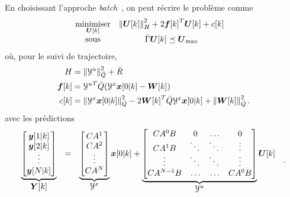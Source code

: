 \documentclass[../main.tex]{subfiles}
\begin{document}
En choisissant l'approche \emph{batch}~\cite[Chapter 8.2]{BorrelliEtAl2017}, on peut récrire le problème comme
\begin{equation}
  \label{eq:quadratic_objective_compact_batch_fr}
  \begin{aligned}
    \begin{matrix}
      \mathop{\textrm{minimiser}}\limits_{\boldsymbol{U}[k]} &
      \left\lVert\boldsymbol{U}[k]\right\rVert^{2}_{H} + 2{\boldsymbol{f}[k]}^{T}\boldsymbol{U}[k] + c[k] &\\
      \mathrm{sous} & \bar{\Gamma}\boldsymbol{U}[k]\preceq {\boldsymbol{U}}_{\text{max}}
    \end{matrix}
  \end{aligned}
\end{equation}
où, pour le suivi de trajectoire,
\begin{align}
  \label{eq:construction_H}
H&=\left\lVert\mathcal{Y}^{u}\right\rVert^{2}_{\bar{Q}}+\bar{R}\\
\boldsymbol{f}[k]&={\mathcal{Y}^{u}}^{T}\bar{Q}(\mathcal{Y}^{x}\boldsymbol{x}[0|k]-\boldsymbol{W}[k])\\
c[k]&=\left\lVert\mathcal{Y}^{x}\boldsymbol{x}[0|k]\right\rVert^{2}_{\bar{Q}}-2{\boldsymbol{W}[k]}^{T}\bar{Q}{\mathcal{Y}^{x}}\boldsymbol{x}[0|k]+\left\lVert\boldsymbol{W}[k]\right\rVert^{2}_{\bar{Q}}.
\end{align}
avec les prédictions
\begin{equation}
    \begin{matrix}
      \underbrace{
        \left[
          \begin{matrix}
            \vec{y}[1|k] \\
            \vec{y}[2|k] \\
            \vdots \\
            \vec{y}[\predhorz|k]
          \end{matrix}
        \right]
      }_{\textstyle \vec{Y}[k]} &=&
      \underbrace{
        \left[
          \begin{matrix}
            CA^{1} \\
            CA^{2} \\
            \vdots \\
            CA^{\predhorz}
          \end{matrix}
        \right]
      }_{\textstyle \mathcal{Y}^{x}}
      \vec{x}[0|k]+
      \underbrace{
        \left[
          \begin{matrix}
            CA^{0}B & 0 & \dots & 0 \\
            CA^{1}B& \ddots & \ddots & \vdots      \\
            \vdots     & \ddots   & \ddots & \vdots    \\
            CA^{\predhorz-1}B & \dots & \dots & CA^{0}B
          \end{matrix}
        \right]
      }_{\textstyle \mathcal{Y}^{u}}
      \vec{U}[k]
    \end{matrix}
    \quad.
\end{equation}
\end{document}
